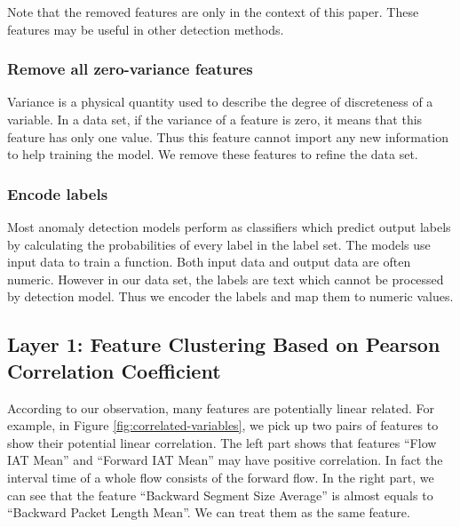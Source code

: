 \documentclass{ieeeaccess}
\theoremstyle{definition}
\begin{document}
Note that the removed features are only in the context of this paper. These features may be useful in other detection methods.

\subsubsection{Remove all zero-variance features}

Variance is a physical quantity used to describe the degree of discreteness of a variable. In a data set, if the variance of a feature is zero, it means that this feature has only one value. Thus this feature cannot import any new information to help training the model. We remove these features to refine the data set.

\subsubsection{Encode labels}

Most anomaly detection models perform as classifiers which predict output labels by calculating the probabilities of every label in the label set. The models use input data to train a function. Both input data and output data are often numeric. However in our data set, the labels are text which cannot be processed by detection model. Thus we encoder the labels and map them to numeric values.

\subsection{Layer 1: Feature Clustering Based on Pearson Correlation Coefficient}


According to our observation, many features are potentially linear related. For example, in Figure \ref{fig:correlated-variables}, we pick up two pairs of features to show their potential linear correlation. The left part shows that features ``Flow IAT Mean'' and ``Forward IAT Mean'' may have positive correlation. In fact the interval time of a whole flow consists of the forward flow. In the right part, we can see that the feature ``Backward Segment Size Average'' is almost equals to ``Backward Packet Length Mean''. We can treat them as the same feature. 
\end{document}

